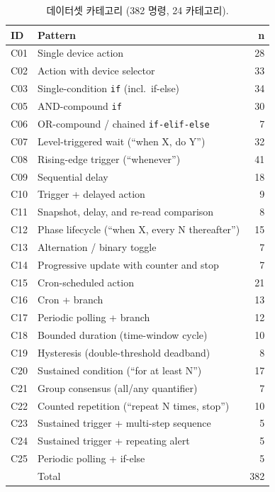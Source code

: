 \documentclass[sigconf,nonacm,anonymous,review]{acmart}
\begin{document}
\begin{table}[h]
\centering
\caption{데이터셋 카테고리 (382 명령, 24 카테고리).}
\label{tab:categories}
\small
\setlength{\tabcolsep}{4pt}
\begin{tabular}{llr}
\toprule
ID & Pattern & n \\
\midrule
C01 & Single device action & 28 \\
C02 & Action with device selector & 33 \\
C03 & Single-condition \texttt{if} (incl.\ if-else) & 34 \\
C05 & AND-compound \texttt{if} & 30 \\
C06 & OR-compound / chained \texttt{if-elif-else} & 7 \\
C07 & Level-triggered wait (``when X, do Y'') & 32 \\
C08 & Rising-edge trigger (``whenever'') & 41 \\
C09 & Sequential delay & 18 \\
C10 & Trigger + delayed action & 9 \\
C11 & Snapshot, delay, and re-read comparison & 8 \\
C12 & Phase lifecycle (``when X, every N thereafter'') & 15 \\
C13 & Alternation / binary toggle & 7 \\
C14 & Progressive update with counter and stop & 7 \\
C15 & Cron-scheduled action & 21 \\
C16 & Cron + branch & 13 \\
C17 & Periodic polling + branch & 12 \\
C18 & Bounded duration (time-window cycle) & 10 \\
C19 & Hysteresis (double-threshold deadband) & 8 \\
C20 & Sustained condition (``for at least N'') & 17 \\
C21 & Group consensus (all/any quantifier) & 7 \\
C22 & Counted repetition (``repeat N times, stop'') & 10 \\
C23 & Sustained trigger + multi-step sequence & 5 \\
C24 & Sustained trigger + repeating alert & 5 \\
C25 & Periodic polling + if-else & 5 \\
\midrule
 & Total & 382 \\
\bottomrule
\end{tabular}
\end{table}
\end{document}
